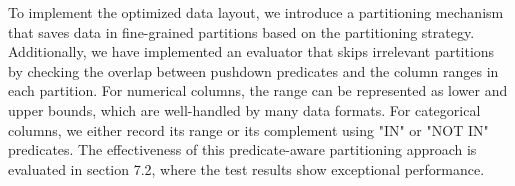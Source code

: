 
To implement the optimized data layout, we introduce a partitioning mechanism that saves data in fine-grained partitions based on the partitioning strategy. Additionally, we have implemented an evaluator that skips irrelevant partitions by checking the overlap between pushdown predicates and the column ranges in each partition. For numerical columns, the range can be represented as lower and upper bounds, which are well-handled by many data formats. For categorical columns, we either record its range or its complement using "IN" or "NOT IN" predicates. The effectiveness of this predicate-aware partitioning approach is evaluated in section 7.2, where the test results show exceptional performance.

